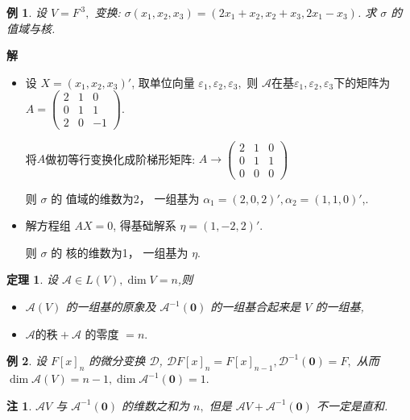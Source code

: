\documentclass[13pt]{beamer}
\newtheorem{thm}{定理}
\newtheorem{exa}{例}
\newtheorem*{rem}{注}
\def\sol{{\bf 解~~ }}
\def\A{\mathscr{A}}
\def\D{\mathscr{D}}
\def\0{\mathbf{0}}
\begin{document}
\begin{frame}
\begin{exa}\label{ex-3}
设 $V=F^{\, 3},$ 变换: $\sigma \left(x_{1}, x_{2}, x_{3}\right)=\left(2 x_{1}+x_{2}, x_{2}+x_{3}, 2 x_{1}-x_{3}\right)$. 求 $\sigma $ 的值域与核.
\end{exa}
\sol 
\begin{itemize}
	\item 设 $X=\left( x_1, x_2, x_3 \right)'$, 
取单位向量 $\varepsilon_{1}, \varepsilon_{2}, \varepsilon_{3},$ 则 
$\A$在基$\varepsilon_{1}, \varepsilon_{2}, \varepsilon_{3}$下的矩阵为
$A=\left(\begin{array}{ccc}2 & 1 & 0 \\ 0 & 1 & 1 \\ 2 & 0 & -1\end{array}\right).$

将$A$做初等行变换化成阶梯形矩阵:
$A\rightarrow\left(\begin{array}{ccc}2 & 1 & 0 \\ 0 & 1 & 1 \\ 0 & 0 & 0\end{array}\right)$
 
则 $\sigma $ 的 值域的维数为2， 一组基为 $\alpha_{1}=(2,0,2)', \alpha_{2}=(1,1,0)'$,.

	\item  解方程组 $A X=0$, 得基础解系 $\eta=(1,-2,2)'$.
	
则 $\sigma $ 的 核的维数为1， 一组基为  $\eta$.
\end{itemize}
\end{frame}



\begin{frame}
\begin{thm}
设 $\A  \in L(V), \operatorname{dim} V=n$,则 
\begin{itemize}
\item $\A (V)$ 的一组基的原象及 $\A^{-1}(\0)$ 的一组基合起来是 $V$ 的一组基,
\item $\A  \mbox{的秩}+ \A \mbox{ 的零度 }=n.$
\end{itemize}

\end{thm}

\begin{exa}
设 $F[x]_{n}$ 的微分变换 $\D$, 
$\D  F[x]_{n}=F[x]_{n-1}, \D ^{-1}(\0)=F,$ 从而 $\operatorname{dim} \A (V)=n-1, \operatorname{dim} \A ^{-1}(\0)=1 .$
\end{exa}

\begin{rem}
	$\A  V$ 与 $\A^{-1}(\0)$ 的维数之和为 $n,$ 但是 $\A  V+\A^{-1}(\0)$ 不一定是直和.
\end{rem}
\end{frame}
\end{document}
